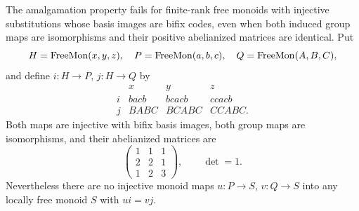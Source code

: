 \begin{example}
\label{G:bifix-freefactor-AP}
The amalgamation property fails for finite-rank free monoids
with injective substitutions whose basis images are bifix
codes, even when both induced group maps are isomorphisms
and their positive abelianized matrices are identical.
Put
\[
 H=\mathrm{FreeMon}(x,y,z),\quad P=\mathrm{FreeMon}(a,b,c),\quad
 Q=\mathrm{FreeMon}(A,B,C),
\]
and define $i:H\to P$, $j:H\to Q$ by
\[
\begin{array}{c|ccc}
 &x&y&z\\\hline
 i&bacb&bcacb&ccacb\\
 j&BABC&BCABC&CCABC.
\end{array}
 \tag{BF.1}
\]
Both maps are injective with bifix basis images, both group
maps are isomorphisms, and their abelianized matrices are
\[
 \begin{pmatrix}1&1&1\\2&2&1\\1&2&3\end{pmatrix},
 \qquad \det=1.
 \tag{BF.2}
\]
Nevertheless there are no injective monoid maps $u:P\to S$,
$v:Q\to S$ into any locally free monoid $S$ with $ui=vj$.
\end{example}

